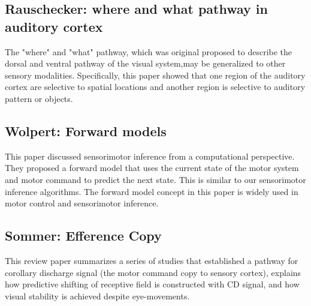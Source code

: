 \documentclass{article} %
\begin{document}
\subsection{Rauschecker: where and what pathway in auditory cortex}

The "where" and "what" pathway, which was original proposed to describe the 
dorsal and ventral pathway of the visual system,may be generalized to other sensory 
modalities. Specifically, this paper \cite{Rauschecker2000} 
showed that one region of the auditory cortex are selective to spatial locations and 
another region is selective to auditory pattern or objects. 


\subsection{Wolpert: Forward models}

This paper \cite{Wolpert1996} discussed sensorimotor inference from a
computational perspective. They proposed a forward model that uses the current
state of the motor system and motor command to predict the next state. This is
similar to our sensorimotor inference algorithms. The forward model concept in
this paper is widely used in motor control and sensorimotor inference.

\subsection{Sommer: Efference Copy}

This review paper \cite{Sommer2006} summarizes a series of studies that
established a  pathway for corollary discharge signal (the motor command copy to
sensory cortex), explains how predictive shifting of receptive field is
constructed with CD signal, and how visual stability is achieved despite
eye-movements.



%

\end{document}

